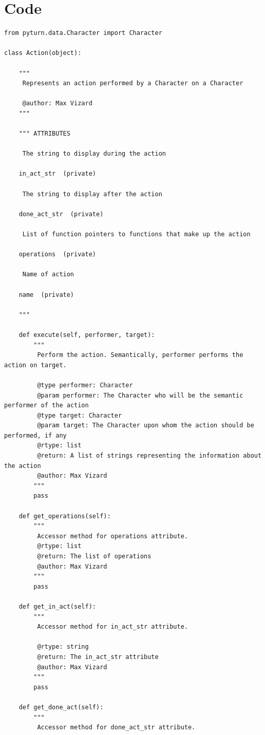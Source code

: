 \documentclass[11pt]{report}
\begin{document}
\section{Code}
\begin{verbatim}
from pyturn.data.Character import Character

class Action(object):

    """
     Represents an action performed by a Character on a Character

     @author: Max Vizard
    """

    """ ATTRIBUTES

     The string to display during the action

    in_act_str  (private)

     The string to display after the action

    done_act_str  (private)

     List of function pointers to functions that make up the action

    operations  (private)

     Name of action

    name  (private)

    """

    def execute(self, performer, target):
        """
         Perform the action. Semantically, performer performs the action on target.

         @type performer: Character
         @param performer: The Character who will be the semantic performer of the action
         @type target: Character
         @param target: The Character upon whom the action should be performed, if any
         @rtype: list
         @return: A list of strings representing the information about the action
         @author: Max Vizard
        """
        pass

    def get_operations(self):
        """
         Accessor method for operations attribute.
         @rtype: list
         @return: The list of operations
         @author: Max Vizard
        """
        pass

    def get_in_act(self):
        """
         Accessor method for in_act_str attribute.
         
         @rtype: string
         @return: The in_act_str attribute
         @author: Max Vizard
        """
        pass

    def get_done_act(self):
        """
         Accessor method for done_act_str attribute.
         

\end{verbatim}
\end{document}
